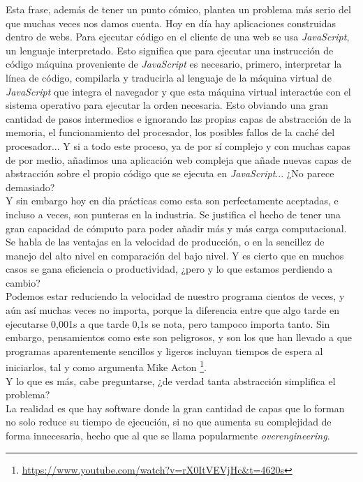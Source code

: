 Esta frase, además de tener un punto cómico, plantea un problema más serio del que muchas veces nos damos cuenta. Hoy en día hay aplicaciones construidas dentro de webs. Para ejecutar código en el cliente de una web se usa \emph{JavaScript}, un lenguaje interpretado. Esto significa que para ejecutar una instrucción de código máquina proveniente de \emph{JavaScript} es necesario, primero, interpretar la línea de código, compilarla y traducirla al lenguaje de la máquina virtual de \emph{JavaScript} que integra el navegador y que esta máquina virtual interactúe con el sistema operativo para ejecutar la orden necesaria. Esto obviando una gran cantidad de pasos intermedios e ignorando las propias capas de abstracción de la memoria, el funcionamiento del procesador, los posibles fallos de la caché del procesador... Y si a todo este proceso, ya de por sí complejo y con muchas capas de por medio, añadimos una aplicación web compleja que añade nuevas capas de abstracción sobre el propio código que se ejecuta en \emph{JavaScript}... ¿No parece demasiado?\\

Y sin embargo hoy en día prácticas como esta son perfectamente aceptadas, e incluso a veces, son punteras en la industria. Se justifica el hecho de tener una gran capacidad de cómputo para poder añadir más y más carga computacional. Se habla de las ventajas en la velocidad de producción, o en la sencillez de manejo del alto nivel en comparación del bajo nivel. Y es cierto que en muchos casos se gana eficiencia o productividad, ¿pero y lo que estamos perdiendo a cambio?\\

Podemos estar reduciendo la velocidad de nuestro programa cientos de veces, y aún así muchas veces no importa, porque la diferencia entre que algo tarde en ejecutarse 0,001s a que tarde 0,1s se nota, pero tampoco importa tanto. Sin embargo, pensamientos como este son peligrosos, y son los que han llevado a que programas aparentemente sencillos y ligeros incluyan tiempos de espera al iniciarlos, tal y como argumenta Mike Acton                           \footnote{\url{https://www.youtube.com/watch?v=rX0ItVEVjHc&t=4620s}}.\\

Y lo que es más, cabe preguntarse, ¿de verdad tanta abstracción simplifica el problema?\\

La realidad es que hay software donde la gran cantidad de capas que lo forman no solo reduce su tiempo de ejecución, si no que aumenta su complejidad de forma innecesaria, hecho que al que se llama popularmente \emph{overengineering}.\\

